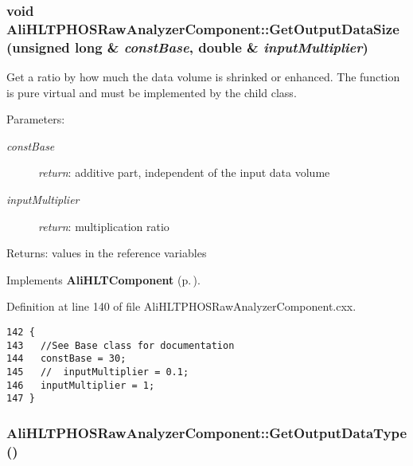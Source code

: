 \subsubsection{\setlength{\rightskip}{0pt plus 5cm}void Ali\-HLTPHOSRaw\-Analyzer\-Component::Get\-Output\-Data\-Size (unsigned long \& {\em const\-Base}, double \& {\em input\-Multiplier})\hspace{0.3cm}{\tt  [virtual]}}\label{classAliHLTPHOSRawAnalyzerComponent_a15}


Get a ratio by how much the data volume is shrinked or enhanced. The function is pure virtual and must be implemented by the child class. \begin{Desc}
\item[Parameters:]
\begin{description}
\item[{\em const\-Base}]{\em return\/}: additive part, independent of the input data volume \item[{\em input\-Multiplier}]{\em return\/}: multiplication ratio \end{description}
\end{Desc}
\begin{Desc}
\item[Returns:]values in the reference variables \end{Desc}


Implements {\bf Ali\-HLTComponent} {\rm (p.\,\pageref{classAliHLTComponent_a12})}.

Definition at line 140 of file Ali\-HLTPHOSRaw\-Analyzer\-Component.cxx.

\footnotesize\begin{verbatim}142 {
143   //See Base class for documentation 
144   constBase = 30;
145   //  inputMultiplier = 0.1;
146   inputMultiplier = 1;
147 }
\end{verbatim}\normalsize 


\subsubsection{ Ali\-HLTPHOSRaw\-Analyzer\-Component::Get\-Output\-Data\-Type ()\hspace{0.3cm}{\tt  [virtual]}}\label{classAliHLTPHOSRawAnalyzerComponent_a14}


